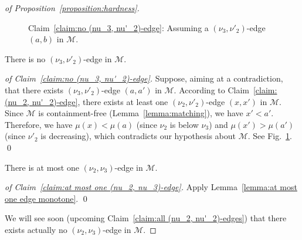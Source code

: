 \documentclass[a4paper]{llncs}
\begin{document}
\begin{proof}[of Proposition~\ref{proposition:hardness}]
\begin{figure}[t!]
    \caption{\label{fig:subfig:no (nu_3, nu'_2)-edge}%
      Claim~\ref{claim:no (nu_3, nu'_2)-edge}:
      Assuming a $(\nu_3, \nu'_2)$-edge $(a, b)$ in $\mathcal{M}$.
    }
  \end{figure}

  \begin{claim}
    \label{claim:no (nu_3, nu'_2)-edge}
    There is no $(\nu_3, \nu'_2)$-edge in $\mathcal{M}$.
  \end{claim}

  \begin{proof}[of Claim~\ref{claim:no (nu_3, nu'_2)-edge}]
    Suppose, aiming at a contradiction, that there exists
    $(\nu_3, \nu'_2)$-edge $(a, a')$ in $\mathcal{M}$.
    According to Claim~\ref{claim:(nu_2, nu'_2)-edge}, there
    exists at least one $(\nu_2, \nu'_2)$-edge $(x, x')$ in $\mathcal{M}$.
    Since $\mathcal{M}$ is containment-free (Lemma~\ref{lemma:matching}),
    we have $x' < a'$.
    Therefore,
    we have $\mu(x) < \mu(a)$ (since $\nu_2$ is below $\nu_3$) and
    $\mu(x') > \mu(a')$ (since $\nu'_2$ is decreasing),
    which contradicts our hypothesis about $\mathcal{M}$.
    See Fig.~\ref{fig:subfig:no (nu_3, nu'_2)-edge}.
    \qed
  \end{proof}

  \begin{claim}
    \label{claim:at most one (nu_2, nu_3)-edge}
    There is at most one $(\nu_2, \nu_3)$-edge
    in $\mathcal{M}$.
  \end{claim}

  \begin{proof}[of Claim~\ref{claim:at most one (nu_2, nu_3)-edge}]
    Apply Lemma~\ref{lemma:at most one edge monotone}.
    \qed
  \end{proof}

    We will see soon (upcoming Claim~\ref{claim:all (nu_2, nu'_2)-edges})
    that there exists actually no $(\nu_2, \nu_3)$-edge
    in $\mathcal{M}$.


\end{proof}
\end{document}
